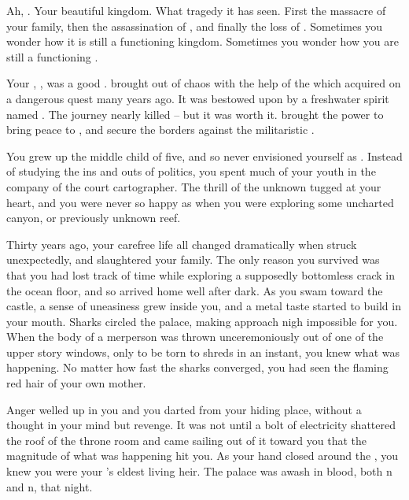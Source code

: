 \documentclass[char]{NeptuneBall}
\begin{document}
\name{\cKing{}}



Ah, \pAtlantis{}. Your beautiful kingdom. What tragedy it has seen. First the massacre of your family, then the assassination of \cQueen{\King{}} \cQueen{}, and finally the loss of \cAriel{\Prince{}} \cAriel{}. Sometimes you wonder how it is still a functioning kingdom. Sometimes you wonder how you are still a functioning \cKing{\King{}}.

Your \cExKing{\parent{}}, \cExKing{\King} \cExKing{}, was a good \cExKing{\King{}}. \cExKing{\They{}} brought \pAtlantis{} out of chaos with the help of the \iTrident{\MYname{}} which \cExKing{\they{}} acquired on a dangerous quest many years ago. It was bestowed upon \cExKing{\them{}} by a freshwater spirit named \cNixie{}. The journey nearly killed \cExKing{\them{}} -- but it was worth it. \iTrident{\MYname{}} brought \cExKing{} the power to bring peace to \pAtlantis{}, and secure the borders against the militaristic \pPacifica{}.

You grew up the middle child of five, and so never envisioned yourself as \cKing{\King{}}. Instead of studying the ins and outs of politics, you spent much of your youth in the company of the court cartographer. The thrill of the unknown tugged at your heart, and you were never so happy as when you were exploring some uncharted canyon, or previously unknown reef.

Thirty years ago, your carefree life all changed dramatically when \pPacifica{} struck unexpectedly, and slaughtered your family. The only reason you survived was that you had lost track of time while exploring a supposedly bottomless crack in the ocean floor, and so arrived home well after dark. As you swam toward the castle, a sense of uneasiness grew inside you, and a metal taste started to build in your mouth. Sharks circled the palace, making approach nigh impossible for you. When the body of a merperson was thrown unceremoniously out of one of the upper story windows, only to be torn to shreds in an instant, you knew what was happening. No matter how fast the sharks converged, you had seen the flaming red hair of your own mother.

Anger welled up in you and you darted from your hiding place, without a thought in your mind but revenge. It was not until a bolt of electricity shattered the roof of the throne room and \iTrident{\MYname{}} came sailing out of it toward you that the magnitude of what was happening hit you. As your hand closed around the \iTrident{\MYname{}}, you knew you were your \cExKing{\parent{}}'s eldest living heir. The palace was awash in blood, both \pPacifica{}n and \pAtlantis{}n, that night. 
\end{document}
